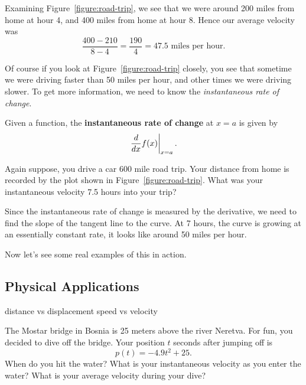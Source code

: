 \begin{solution}
Examining Figure~\ref{figure:road-trip}, we see that we were around
200 miles from home at hour 4, and 400 miles from home at hour 8. Hence our average velocity was 
\[
\frac{400-210}{8-4} = \frac{190}{4} = 47.5 \text{ miles per hour.}
\]
\end{solution}

Of course if you look at Figure~\ref{figure:road-trip} closely, you
see that sometime we were driving faster than 50 miles per hour, and
other times we were driving slower. To get more information, we need
to know the \textit{instantaneous rate of change}.

\begin{definition}
Given a function, the \textbf{instantaneous rate of change} at $x=a$ is given by
\[
\left.\frac{d}{dx} f(x) \right|_{x=a}.
\] 
\end{definition}

\begin{example} 
Again suppose, you drive a car 600 mile road trip. Your distance from
home is recorded by the plot shown in
Figure~\ref{figure:road-trip}. What was your instantaneous velocity
7.5 hours into your trip?
\end{example}
\begin{solution}
Since the instantaneous rate of change is measured by the derivative,
we need to find the slope of the tangent line to the curve. At 7
hours, the curve is growing at an essentially constant rate, it looks
like around 50 miles per hour.
\end{solution}

Now let's see some real examples of this in action.


\subsection*{Physical Applications}

distance vs displacement
speed vs velocity

\begin{example}
The Mostar bridge in Bosnia is 25 meters above the river
Neretva. For fun, you decided to dive off the bridge. Your position
$t$ seconds after jumping off is
\[
p(t) = -4.9t^2 + 25.
\]
When do you hit the water? What is your instantaneous velocity as you
enter the water?  What is your average velocity during your dive?
\end{example}

